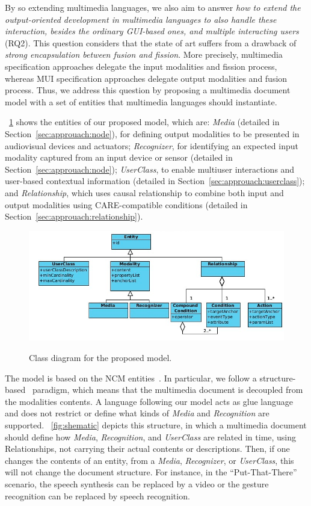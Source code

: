 \documentclass[
  doutorado,
  american
]{ThesisPUC}
\newcommand{\fig}[1]{\figurename~\ref{#1}}
\newcommand{\sect}[1]{Section~\ref{#1}}
\newcommand{\captionvspace}{\vspace{-1.3em}}
\begin{document}
By so extending multimedia languages, we also aim to answer \textit{how to
extend the output-oriented development in multimedia languages to also handle
these interaction, besides the ordinary GUI-based ones, and multiple interacting
users} (RQ2). This question considers that the state of art suffers from a
drawback of \textit{strong encapsulation between fusion and fission}. More
precisely, multimedia specification approaches delegate the input modalities and
fission process, whereas MUI specification approaches delegate output modalities
and fusion process. Thus, we address this question by proposing a multimedia
document model with a set of entities that multimedia languages should
instantiate. 

\fig{fig:model} shows the entities of our proposed model, which are:
\textit{Media} (detailed in \sect{sec:approuach:node}), for defining output
modalities to be presented in audiovisual devices and actuators;
\textit{Recognizer}, for identifying an expected input modality captured from an
input device or sensor (detailed in \sect{sec:approuach:node});
\textit{UserClass}, to enable multiuser interactions and user-based contextual
information (detailed in \sect{sec:approuach:userclass}); and
\textit{Relationship}, which uses causal relationship to combine both input and
output modalities using CARE-compatible conditions (detailed in
\sect{sec:approuach:relationship}).

\begin{figure}[!ht]
\begin{center}
	\includegraphics[width=12cm, keepaspectratio]{img/img9.png}
	\caption{Class diagram for the proposed model.}
	\captionvspace
	\label{fig:model}
\end{center}
\end{figure}

The model is based on the NCM entities~\cite{soares_nested_2009}. In particular,
we follow a structure-based~\cite{bolt_put-that-there:_1980} paradigm, which
means that the multimedia document is decoupled from the modalities contents. A
language following our model acts as glue language and does not restrict or
define what kinds of \textit{Media} and 
\textit{Recognition} are supported. \fig{fig:shematic} depicts this structure, 
in which a
multimedia document should define how \textit{Media}, \textit{Recognition}, and 
\textit{UserClass }are related in time, using Relationships, not carrying their
actual contents or descriptions. Then, if one changes the contents of an entity,
from a 
\textit{Media}, \textit{Recognizer}, or \textit{UserClass}, this will not change
the document structure. For instance, in the “Put-That-There” scenario, the
speech synthesis can be replaced by a video or the gesture recognition can be
replaced by speech recognition.
\end{document}

